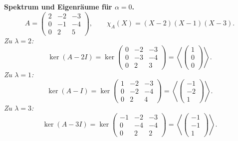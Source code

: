 \documentclass[11pt, a4paper]{article}
\begin{document}
\medskip
\textbf{Spektrum und Eigenräume für $\alpha=0$.}
\[
A=
\begin{pmatrix}2&-2&-3\\ 0&-1&-4\\ 0&2&5\end{pmatrix},\qquad
\chi_A(X)=(X-2)(X-1)(X-3).
\]
\emph{Zu $\lambda=2$:}
\[
\ker(A-2I)=
\ker\begin{pmatrix}0&-2&-3\\ 0&-3&-4\\ 0&2&3\end{pmatrix}
=\left\langle\begin{pmatrix}1\\0\\0\end{pmatrix}\right\rangle.
\]
\emph{Zu $\lambda=1$:}
\[
\ker(A-I)=
\ker\begin{pmatrix}1&-2&-3\\ 0&-2&-4\\ 0&2&4\end{pmatrix}
=\left\langle\begin{pmatrix}-1\\-2\\1\end{pmatrix}\right\rangle.
\]
\emph{Zu $\lambda=3$:}
\[
\ker(A-3I)=
\ker\begin{pmatrix}-1&-2&-3\\ 0&-4&-4\\ 0&2&2\end{pmatrix}
=\left\langle\begin{pmatrix}-1\\-1\\1\end{pmatrix}\right\rangle.
\]
\end{document}
